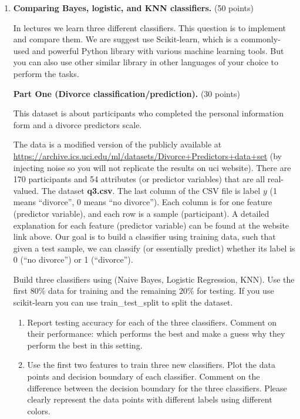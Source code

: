 \documentclass[twoside,10pt]{article}
\begin{document}
\begin{enumerate}
\begin{enumerate}
\end{enumerate}
 
\item {\bf Comparing Bayes, logistic, and KNN classifiers.} (50 points)

In lectures we learn three different classifiers. This question is to implement and compare them. We are suggest use \textsf{Scikit-learn}, which is a commonly-used and powerful \textsf{Python} library with various machine learning tools. But you can also use other similar library in other languages of your choice to perform the tasks. 



\textbf{Part One (Divorce classification/prediction).} (30 points) 

This dataset is about participants who completed the personal information form and a divorce predictors scale. 

The data is a modified version of the publicly available at \url{https://archive.ics.uci.edu/ml/datasets/Divorce+Predictors+data+set} (by injecting noise so you will not replicate the results on uci website). There are 170 participants and 54 attributes (or predictor variables) that are all real-valued. The dataset \textbf{q3.csv}. The last column of the CSV file is label $y$ (1 means ``divorce'', 0 means ``no divorce''). Each column is for one feature (predictor variable), and each row is a sample (participant). A detailed explanation for each feature (predictor variable) can be found at the website link above. Our goal is to build a classifier using training data, such that given a test sample, we can classify (or essentially predict) whether its label is 0 (``no divorce'') or 1 (``divorce''). 



Build three classifiers using (Naive Bayes, Logistic Regression, KNN). Use the first $80\%$ data for training and the remaining $20\%$ for testing. If you use \textsf{scikit-learn} you can use \textsf{train\_test\_split} to split the dataset. 

\begin{enumerate}

	\item Report testing accuracy for each of the three classifiers.  Comment on their performance: which performs the best and make a guess why they perform the best in this setting. 
	\item Use the first two features to train three new classifiers. Plot the data points and decision boundary of each classifier. Comment on the difference between the decision boundary for the three classifiers. Please clearly represent the data points with different labels using different colors.
\end{enumerate}


\end{enumerate}
\end{document}
